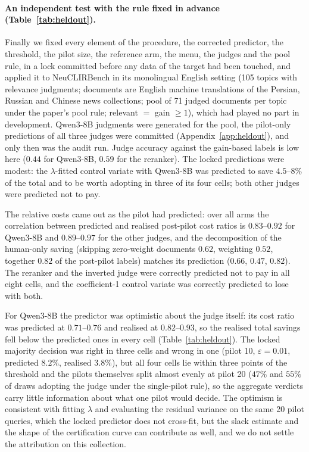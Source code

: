 \documentclass{article}
\newcommand{\eps}{\varepsilon}
\begin{document}
\paragraph{An independent test with the rule fixed in advance (Table~\ref{tab:heldout}).} Finally we fixed every element of the procedure, the corrected predictor, the threshold, the pilot size, the reference arm, the menu, the judges and the pool rule, in a lock committed before any data of the target had been touched, and applied it to NeuCLIRBench \citep{lawrie2025neuclirbench} in its monolingual English setting (105 topics with relevance judgments; documents are English machine translations of the Persian, Russian and Chinese news collections; pool of 71 judged documents per topic under the paper's pool rule; relevant $=$ gain $\ge1$), which had played no part in development. Qwen3-8B judgments were generated for the pool, the pilot-only predictions of all three judges were committed (Appendix~\ref{app:heldout}), and only then was the audit run. Judge accuracy against the gain-based labels is low here ($0.44$ for Qwen3-8B, $0.59$ for the reranker). The locked predictions were modest: the $\lambda$-fitted control variate with Qwen3-8B was predicted to save $4.5$--$8\%$ of the total and to be worth adopting in three of its four cells; both other judges were predicted not to pay.

The relative costs came out as the pilot had predicted: over all arms the correlation between predicted and realised post-pilot cost ratios is $0.83$--$0.92$ for Qwen3-8B and $0.89$--$0.97$ for the other judges, and the decomposition of the human-only saving (skipping zero-weight documents $0.62$, weighting $0.52$, together $0.82$ of the post-pilot labels) matches its prediction ($0.66$, $0.47$, $0.82$). The reranker and the inverted judge were correctly predicted not to pay in all eight cells, and the coefficient-1 control variate was correctly predicted to lose with both.

For Qwen3-8B the predictor was optimistic about the judge itself: its cost ratio was predicted at $0.71$--$0.76$ and realised at $0.82$--$0.93$, so the realised total savings fell below the predicted ones in every cell (Table~\ref{tab:heldout}). The locked majority decision was right in three cells and wrong in one (pilot 10, $\eps=0.01$, predicted $8.2\%$, realised $3.8\%$), but all four cells lie within three points of the threshold and the pilots themselves split almost evenly at pilot 20 ($47\%$ and $55\%$ of draws adopting the judge under the single-pilot rule), so the aggregate verdicts carry little information about what one pilot would decide. The optimism is consistent with fitting $\lambda$ and evaluating the residual variance on the same 20 pilot queries, which the locked predictor does not cross-fit, but the slack estimate and the shape of the certification curve can contribute as well, and we do not settle the attribution on this collection.
\end{document}
